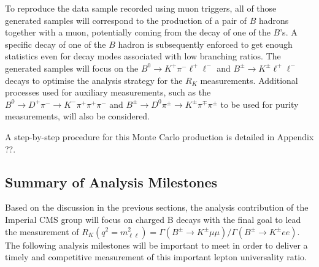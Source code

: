 \documentclass[a4paper,11pt]{article}
\begin{document}
To reproduce the data sample recorded using muon triggers, all of those generated samples will correspond to the production of a pair of $B$ hadrons together with a muon, potentially coming from the decay of one of the $B$'s. A specific decay of one of the $B$ hadron is subsequently enforced to get enough statistics even for decay modes associated with low branching ratios. The generated samples will focus on the $B^0\rightarrow K^+ \pi^- \ell^+\ell^-$ and $B^{\pm}\rightarrow K^{\pm} \ell^+\ell^-$ decays to optimise the analysis strategy for the $R_{K}$ measurements. Additional processes used for auxiliary measurements, such as the $B^0\rightarrow D^+ \pi^-  \rightarrow K^-  \pi^+  \pi^+ \pi^-$ and $B^{\pm} \rightarrow D^0 \pi^{\pm} \rightarrow K^{\pm}  \pi^{\mp} \pi^{\pm}$ to be used for purity measurements, will also be considered.

A step-by-step procedure for this Monte Carlo production is detailed in Appendix ??.

\subsection{Summary of Analysis Milestones}\label{summary}
Based on the discussion in the previous sections, the analysis contribution of the Imperial CMS group will focus on charged B decays with the final goal to lead the measurement of  $R_{K} (q^2 = m_{\ell\ell}^2)= \Gamma (B^{\pm} \rightarrow K^{\pm} \mu \mu )/\Gamma (B^{\pm} \rightarrow K^{\pm}  e e)$. The following analysis milestones will be important to meet in order to deliver a timely and competitive measurement of this important lepton universality ratio. 
\end{document}
